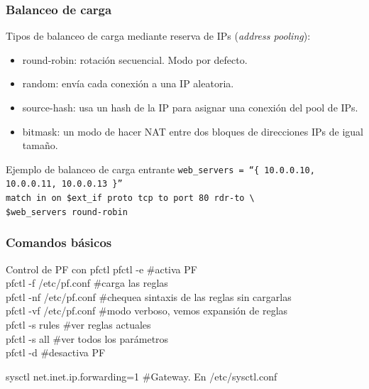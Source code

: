 \documentclass{beamer}
\begin{document}
\begin{frame}
\frametitle{Balanceo de carga}

Tipos de balanceo de carga mediante reserva de IPs (\textit{address pooling}):

\begin{itemize}
\item \alert{round-robin}: rotación secuencial. Modo por defecto. 
\item \alert{random}: envía cada conexión a una IP aleatoria.
\item \alert{source-hash}: usa un hash de la IP para asignar una conexión del pool de IPs.  
\item \alert{bitmask}: un modo de hacer NAT entre dos bloques de direcciones IPs de igual tamaño.
\end{itemize} 

\begin{block}{Ejemplo de balanceo de carga entrante}
\small
\tt web\_servers = ``\{ 10.0.0.10, 10.0.0.11, 10.0.0.13 \}'' \\
match in on \$ext\_if proto tcp to port 80 rdr-to \textbackslash \\
\hspace{7mm} \$web\_servers \alert{round-robin} 
\end{block}

\end{frame}



\begin{frame}
\frametitle{Comandos básicos}


\begin{block}{Control de PF con pfctl}
\alert{pfctl -e} \hspace{4mm} \#activa PF  \\
\alert{pfctl -f /etc/pf.conf} \hspace{2mm} \#carga las reglas \\
\alert{pfctl -nf /etc/pf.conf} \#chequea sintaxis de las reglas sin cargarlas \\
\alert{pfctl -vf /etc/pf.conf} \#modo verboso, vemos expansión de reglas\\
\alert{pfctl -s rules} \hspace{2mm} \#ver reglas actuales \\
\alert{pfctl -s all} \hspace{2mm} \#ver todos los parámetros \\
\alert{pfctl -d} \hspace{2mm} \#desactiva PF

\alert{sysctl net.inet.ip.forwarding=1} \hspace{2mm} \#Gateway. En /etc/sysctl.conf \\

\end{block}

\end{frame}
\end{document}

